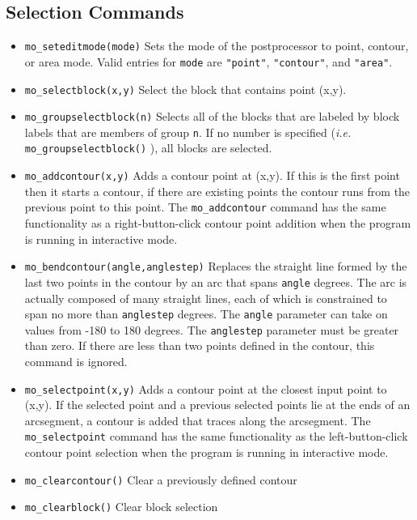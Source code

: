 \subsection{Selection Commands}
\begin{itemize}
\item{\tt mo\_seteditmode(mode)} Sets the mode of the postprocessor to
point, contour, or area mode.  Valid entries for {\tt mode} are
{\tt "point"}, {\tt "contour"}, and {\tt "area"}.
\item{\tt mo\_selectblock(x,y)} Select the block that contains point (x,y).
\item{\tt mo\_groupselectblock(n)} Selects all of the blocks that are labeled by block
        labels that are members of group {\tt n}. If no number is specified ({\em i.e.} {\tt mo\_groupselectblock()} ),
                all blocks are selected.

\item{\tt mo\_addcontour(x,y)} Adds a contour point at (x,y). If this
is the first point then it starts a contour, if there are existing
points the contour runs from the previous point to this point. The
{\tt mo\_addcontour} command has the same functionality as a
right-button-click contour point addition when the program is
running in interactive mode.
\item{\tt mo\_bendcontour(angle,anglestep)} Replaces the straight line
formed by the last two points in the contour by an arc that spans {\tt angle}
degrees.  The arc is actually composed of many straight lines, each
of which is constrained to span no more than {\tt anglestep} degrees.
The {\tt angle} parameter can take on values from -180 to 180 degrees.
The {\tt anglestep} parameter must be greater than zero.  If there are less
than two points defined in the contour, this command is ignored.
\item{\tt mo\_selectpoint(x,y)} Adds a contour point at the closest
input point to (x,y).  If the selected point and a previous
selected points lie at the ends of an arcsegment, a contour is
added that traces along the arcsegment.  The {\tt mo\_selectpoint}
command has the same functionality as the left-button-click contour
point selection when the program is running in interactive mode.
\item{\tt mo\_clearcontour()} Clear a previously defined contour
\item{\tt mo\_clearblock()} Clear block selection
\end{itemize}

